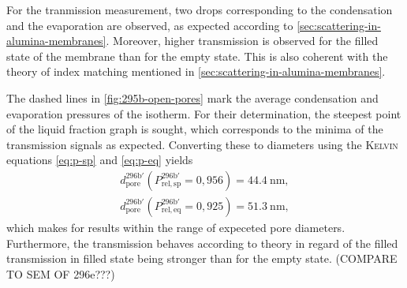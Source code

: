 \documentclass[../thesis.tex]{subfiles}
\begin{document}
        For the tranmission measurement, two drops corresponding to the condensation and the evaporation are observed, as expected according to \cref{sec:scattering-in-alumina-membranes}. Moreover, higher transmission is observed for the filled state of the membrane than for the empty state. This is also coherent with the theory of index matching mentioned in \cref{sec:scattering-in-alumina-membranes}.
        \medskip

        The dashed lines in \cref{fig:295b-open-pores} mark the average condensation and evaporation pressures of the isotherm. For their determination, the steepest point of the liquid fraction graph is sought, which corresponds to the minima of the transmission signals as expected. Converting these to diameters using the \textsc{Kelvin} equations \cref{eq:p-sp} and \cref{eq:p-eq} yields
        \begin{align*}
          d_\mathrm{pore}^\mathrm{296b'}(P_\mathrm{rel,sp}^\mathrm{296b'}=0,956)=\SI{44,4}{\nano\meter}, \\
          d_\mathrm{pore}^\mathrm{296b'}(P_\mathrm{rel,eq}^\mathrm{296b'}=0,925)=\SI{51,3}{\nano\meter},
        \end{align*}
        which makes for results within the range of expeceted pore diameters. Furthermore, the transmission behaves according to theory in regard of the filled transmission in filled state being stronger than for the empty state.  (COMPARE TO SEM OF 296e???)
        \medskip

        
\end{document}
